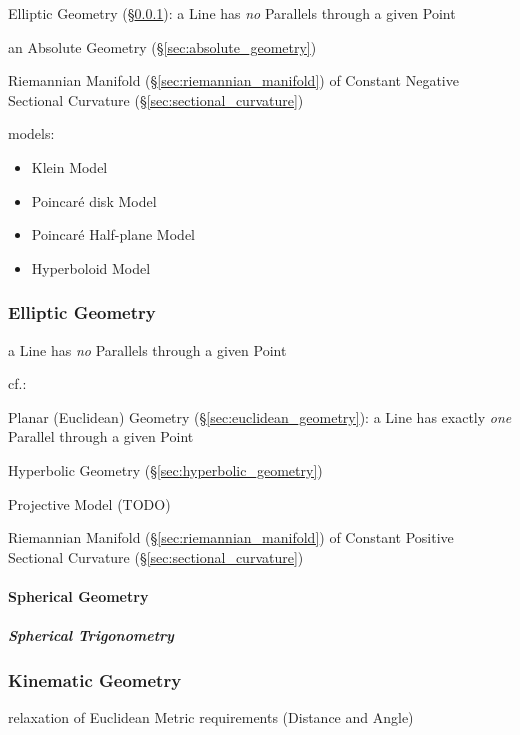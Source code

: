 \fist Elliptic Geometry (\S\ref{sec:elliptic_geometry}): a Line has \emph{no}
  Parallels through a given Point

an Absolute Geometry (\S\ref{sec:absolute_geometry})


Riemannian Manifold (\S\ref{sec:riemannian_manifold}) of Constant Negative
Sectional Curvature (\S\ref{sec:sectional_curvature})

models:
\begin{itemize}
  \item Klein Model
  \item Poincar\'e disk Model
  \item Poincar\'e Half-plane Model
  \item Hyperboloid Model
\end{itemize}



\subsubsection{Elliptic Geometry}\label{sec:elliptic_geometry}

a Line has \emph{no} Parallels through a given Point

cf.:

\fist Planar (Euclidean) Geometry (\S\ref{sec:euclidean_geometry}): a Line has
exactly \emph{one} Parallel through a given Point

\fist Hyperbolic Geometry (\S\ref{sec:hyperbolic_geometry})

Projective Model (TODO)

Riemannian Manifold (\S\ref{sec:riemannian_manifold}) of Constant Positive
Sectional Curvature (\S\ref{sec:sectional_curvature})



\paragraph{Spherical Geometry}\label{sec:spherical_geometry}\hfill

\subparagraph{Spherical Trigonometry}\label{sec:spherical_trigonometry}\hfill



\subsubsection{Kinematic Geometry}\label{sec:kinematic_geometry}\hfill

relaxation of Euclidean Metric requirements (Distance and Angle)

